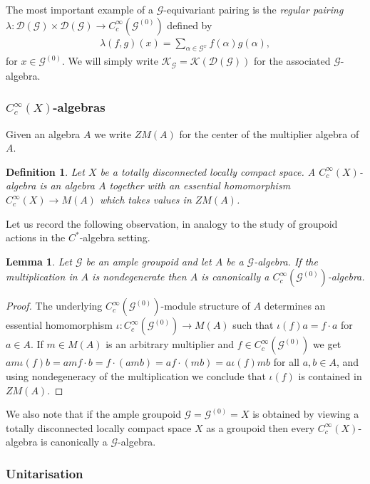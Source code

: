 \documentclass{amsart}
\newtheorem{dfn}[thm]{Definition}
\newtheorem{lemma}[thm]{Lemma}
\newcommand{\G}{\mathcal{G}}
\newcommand{\K}{\mathcal{K}}
\newcommand{\DG}{\mathcal{D}(\mathcal{G})}
\newcommand{\ccinfty}{C_c^\infty}
\begin{document}
The most important example of a $ \G $-equivariant pairing is the \emph{regular pairing} 
$ \lambda: \DG \times\DG \rightarrow \ccinfty(\G^{(0)}) $ defined by  
\begin{align*}
\lambda(f,g)(x) = \sum_{\alpha\in \G^x} f(\alpha) g(\alpha),
\end{align*}
for $ x \in \G^{(0)} $. We will simply write $ \K_\G = \K(\DG) $ for the associated $ \G $-algebra. 

\subsubsection{$ \ccinfty(X) $-algebras} 

Given an algebra $ A $ we write $ ZM(A) $ for the center of the multiplier algebra of $ A $. 

\begin{dfn}
Let $ X $ be a totally disconnected locally compact space. A $ \ccinfty(X) $-algebra is an algebra $ A $ together with an essential homomorphism $ \ccinfty(X) \rightarrow M(A) $ which takes values in $ ZM(A) $. 
\end{dfn}

Let us record the following observation, in analogy to the study of groupoid actions in the $ C^* $-algebra setting. 

\begin{lemma} 
Let $ \G $ be an ample groupoid and let $ A $ be a $ \G $-algebra. If the multiplication in $ A $ is nondegenerate then $ A $ is canonically a $ \ccinfty(\G^{(0)}) $-algebra. \end{lemma} 

\begin{proof}
The underlying $ \ccinfty(\G^{(0)}) $-module structure of $ A $ determines an essential homomorphism $ \iota: \ccinfty(\G^{(0)}) \rightarrow M(A) $ such that $ \iota(f) a = f \cdot a $ for $ a \in A $. If $ m \in M(A) $ is an arbitrary multiplier and $ f \in \ccinfty(\G^{(0)}) $ we 
get $ a m \iota(f) b = am f\cdot b = f \cdot (a m b) = a f \cdot (m b) = a \iota(f) m b $ for all $ a, b \in A $, and using nondegeneracy of the multiplication we conclude 
that $ \iota(f) $ is contained in $ ZM(A) $. 
\end{proof}

We also note that if the ample groupoid $ \G = \G^{(0)} = X $ is obtained by viewing a totally disconnected locally compact space $ X $ as a groupoid then every $ \ccinfty(X) $-algebra is canonically a $ \G $-algebra. 

\subsubsection{Unitarisation} 
\end{document}
